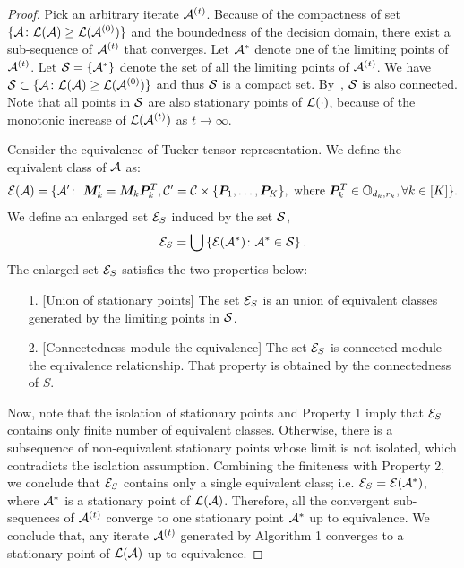 \documentclass[11pt]{article}
\theoremstyle{plain}
\theoremstyle{definition}
\begin{document}
\begin{proof}

Pick an arbitrary iterate $\mathcal{A}^{(t)}$.  Because of the compactness of set $\{\mathcal{A}\colon  \mathcal{L}(\mathcal{A}) \geq \mathcal{L}(\mathcal{A}^{(0)}) \}$ and the boundedness of the decision domain, there exist a sub-sequence of $\mathcal{A}^{(t)}$ that converges. Let $\mathcal{A}^*$ denote one of the limiting points of $\mathcal{A}^{(t)}$. Let $\mathcal{S} = \{\mathcal{A}^*\}$ denote the set of all the limiting points of $\mathcal{A}^{(t)}$. We have $\mathcal{S} \subset \{\mathcal{A}\colon  \mathcal{L}(\mathcal{A}) \geq \mathcal{L}(\mathcal{A}^{(0)}) \}$ and thus $\mathcal{S}$ is a compact set. By~\cite[Propositions 8.2.1 and 13.4.2]{Lange:2012:NAS:2432073}, $\mathcal{S}$ is also connected. Note that all points in $\mathcal{S}$ are also stationary points of $\mathcal{L}(\cdot)$, because of the monotonic increase of $\mathcal{L}(\mathcal{A}^{(t)})$ as $t \rightarrow \infty$. 
 
 
 Consider the equivalence of Tucker tensor representation. We define the equivalent class of $\mathcal{A}$ as:
\begin{equation}
 	\mathcal{E}(\mathcal{A}) = \{ \mathcal{A}'\colon \ \bm M'_k = \bm M_k\bm{P}^T_k, \mathcal{C}' = \mathcal{C} \times \{\bm{P}_1,\ldots,\bm{P}_K\}, \text{ where } \bm{P}^T_k \in \mathbb{O}_{d_k, r_k}, \forall k \in [K] \}.
\end{equation}
We define an enlarged set $\mathcal{E}_S$ induced by the set $\mathcal{S}$, 
\begin{equation}
 \mathcal{E}_S = \bigcup\left\{ \mathcal{E}(\mathcal{A}^*)\colon \mathcal{A}^*\in\mathcal{S}\right\}.
\end{equation}
The enlarged set $\mathcal{E}_S$ satisfies the two properties below:
 \begin{enumerate}
\item [1.] [Union of stationary points] The set $\mathcal{E}_S$ is an union of equivalent  classes generated by the limiting points in $\mathcal{S}$.
\item [2.] [Connectedness module the equivalence]  The set $\mathcal{E}_S$ is connected module the equivalence relationship. That property is obtained by the connectedness of $S$.
 \end{enumerate}
Now, note that the isolation of stationary points and Property 1 imply that $\mathcal{E}_S$ contains only finite number of equivalent classes. Otherwise, there is a subsequence of non-equivalent stationary points whose limit is not isolated, which contradicts the isolation assumption. Combining the finiteness with Property 2, we conclude that $\mathcal{E}_S$ contains only a single equivalent class; i.e. $\mathcal{E}_S = \mathcal{E}(\mathcal{A}^*)$, where $\mathcal{A}^*$ is a stationary point of $\mathcal{L}(\mathcal{A})$. Therefore, all the convergent sub-sequences of $\mathcal{A}^{(t)}$ converge to one stationary point $\mathcal{A}^*$ up to equivalence. We conclude that, any iterate $\mathcal{A}^{(t)}$ generated by Algorithm 1 converges to a stationary point of $\mathcal{L}(\mathcal{A})$ up to equivalence.
 \end{proof}
\end{document}
